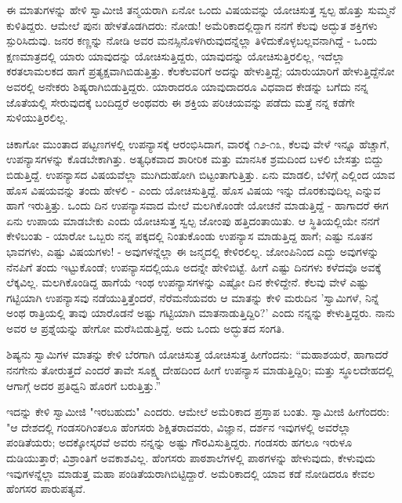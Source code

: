 ಈ ಮಾತುಗಳನ್ನು ಹೇಳಿ ಸ್ವಾಮೀಜಿ ತನ್ಮಯರಾಗಿ ಏನೋ ಒಂದು ವಿಷಯವನ್ನು ಯೋಚಿಸುತ್ತ ಸ್ವಲ್ಪ ಹೊತ್ತು ಸುಮ್ಮನೆ ಕುಳಿತಿದ್ದರು. ಆಮೇಲೆ ಪುನಃ ಹೇಳತೊಡಗಿದರು: ನೋಡು! ಅಮೆರಿಕಾದಲ್ಲಿದ್ದಾಗ ನನಗೆ ಕೆಲವು ಅದ್ಭುತ ಶಕ್ತಿಗಳು ಸ್ಪುರಿಸಿದುವು. ಜನರ ಕಣ್ಣನ್ನು ನೋಡಿ ಅವರ ಮನಸ್ಸಿನೊಳಗಿರುವುದನ್ನೆಲ್ಲಾ ತಿಳಿದುಕೊಳ್ಳಬಲ್ಲವನಾಗಿದ್ದೆ - ಒಂದು ಕ್ಷಣಮಾತ್ರದಲ್ಲಿ ಯಾರು ಯಾವುದನ್ನು ಯೋಚಿಸುತ್ತಿದ್ದರು, ಯಾವುದನ್ನು ಯೋಚಿಸುತ್ತಿರಲಿಲ್ಲ, ಇದೆಲ್ಲಾ ಕರತಲಾಮಲಕದ ಹಾಗೆ ಪ್ರತ್ಯಕ್ಷವಾಗಿಬಿಡುತ್ತಿತ್ತು. ಕೆಲಕೆಲವರಿಗೆ ಅದನ್ನು ಹೇಳುತ್ತಿದ್ದೆ; ಯಾರುಯಾರಿಗೆ ಹೇಳುತ್ತಿದ್ದೆನೋ ಅವರಲ್ಲಿ ಅನೇಕರು ಶಿಷ್ಯರಾಗಿಬಿಡುತ್ತಿದ್ದರು. ಯಾರಾದರೂ ಯಾವುದಾದರೂ ವಿಧವಾದ ಕೇಡನ್ನು ಬಗೆದು ನನ್ನ ಜೊತೆಯಲ್ಲಿ ಸೇರುವುದಕ್ಕೆ ಬಂದಿದ್ದರೆ ಅಂಥವರು ಈ ಶಕ್ತಿಯ ಪರಿಚಯವನ್ನು ಪಡೆದು ಮತ್ತೆ ನನ್ನ ಕಡೆಗೇ ಸುಳಿಯುತ್ತಿರಲಿಲ್ಲ.

ಚಿಕಾಗೋ ಮುಂತಾದ ಪಟ್ಟಣಗಳಲ್ಲಿ ಉಪನ್ಯಾಸಕ್ಕೆ ಆರಂಭಿಸಿದಾಗ, ವಾರಕ್ಕೆ ೧೨-೧೩, ಕೆಲವು ವೇಳೆ ಇನ್ನೂ ಹೆಚ್ಚಾಗೆ, ಉಪನ್ಯಾಸಗಳನ್ನು ಕೊಡಬೇಕಾಗಿತ್ತು. ಅತ್ಯಧಿಕವಾದ ಶಾರೀರಿಕ ಮತ್ತು ಮಾನಸಿಕ ಶ್ರಮದಿಂದ ಬಳಲಿ ಬೇಸತ್ತು ಬಿದ್ದು ಬಿಡುತ್ತಿದ್ದೆ. ಉಪನ್ಯಾಸದ ವಿಷಯವೆಲ್ಲಾ ಮುಗಿದುಹೋಗಿ ಬಿಟ್ಟಂತಾಗುತ್ತಿತ್ತು. ಏನು ಮಾಡಲಿ, ಬೆಳಿಗ್ಗೆ ಎಲ್ಲಿಂದ ಯಾವ ಹೊಸ ವಿಷಯವನ್ನು ತಂದು ಹೇಳಲಿ - ಎಂದು ಯೋಚಿಸುತ್ತಿದ್ದೆ. ಹೊಸ ವಿಷಯ ಇನ್ನು ದೊರಕುವುದಿಲ್ಲ ಎನ್ನುವ ಹಾಗೆ ಇರುತ್ತಿತ್ತು. ಒಂದು ದಿನ ಉಪನ್ಯಾಸವಾದ ಮೇಲೆ ಮಲಗಿಕೊಂಡೇ ಯೋಚನೆ ಮಾಡುತ್ತಿದ್ದೆ - ಹಾಗಾದರೆ ಈಗ ಏನು ಉಪಾಯ ಮಾಡಬೇಕು ಎಂದು ಯೋಚಿಸುತ್ತ ಸ್ವಲ್ಪ ಜೋಂಪು ಹತ್ತಿದಂತಾಯಿತು. ಆ ಸ್ಥಿತಿಯಲ್ಲಿಯೇ ನನಗೆ ಕೇಳಿಬಂತು - ಯಾರೋ ಒಬ್ಬರು ನನ್ನ ಪಕ್ಕದಲ್ಲಿ ನಿಂತುಕೊಂಡು ಉಪನ್ಯಾಸ ಮಾಡುತ್ತಿದ್ದ ಹಾಗೆ; ಎಷ್ಟು ನೂತನ ಭಾವಗಳು, ಎಷ್ಟು ವಿಷಯಗಳು! - ಅವುಗಳನ್ನೆಲ್ಲಾ ಈ ಜನ್ಮದಲ್ಲಿ ಕೇಳಿರಲಿಲ್ಲ. ಜೋಂಪಿನಿಂದ ಎದ್ದು ಅವುಗಳನ್ನು ನೆನಪಿಗೆ ತಂದು ಇಟ್ಟುಕೊಂಡೆ; ಉಪನ್ಯಾಸದಲ್ಲಿಯೂ ಅದನ್ನೇ ಹೇಳಿಬಿಟ್ಟೆ. ಹೀಗೆ ಎಷ್ಟು ದಿನಗಳು ಕಳೆದವೊ ಅವಕ್ಕೆ ಲೆಕ್ಕವಿಲ್ಲ. ಮಲಗಿಕೊಂಡಿದ್ದ ಹಾಗೆಯೆ ಇಂಥ ಉಪನ್ಯಾಸಗಳನ್ನು ಎಷ್ಟೋ ದಿನ ಕೇಳಿದ್ದೇನೆ. ಕೆಲವು ವೇಳೆ ಎಷ್ಟು ಗಟ್ಟಿಯಾಗಿ ಉಪನ್ಯಾಸವು ನಡೆಯುತ್ತಿತ್ತೆಂದರೆ, ನೆರೆಮನೆಯವರು ಆ ಮಾತನ್ನು ಕೇಳಿ ಮರುದಿನ 'ಸ್ವಾಮಿಗಳೆ, ನಿನ್ನೆ ಅಂಥ ರಾತ್ರಿಯಲ್ಲಿ ತಾವು ಯಾರೊಡನೆ ಅಷ್ಟು ಗಟ್ಟಿಯಾಗಿ ಮಾತನಾಡುತ್ತಿದ್ದಿರಿ?' ಎಂದು ನನ್ನನ್ನು ಕೇಳುತ್ತಿದ್ದರು. ನಾನು ಅವರ ಆ ಪ್ರಶ್ನೆಯನ್ನು ಹೇಗೋ ಮರೆಸಿಬಿಡುತ್ತಿದ್ದೆ. ಅದು ಒಂದು ಅದ್ಭುತದ ಸಂಗತಿ.

ಶಿಷ್ಯನು ಸ್ವಾಮಿಗಳ ಮಾತನ್ನು ಕೇಳಿ ಬೆರಗಾಗಿ ಯೋಚಿಸುತ್ತ ಯೋಚಿಸುತ್ತ ಹೀಗೆಂದನು: “ಮಹಾಶಯರೆ, ಹಾಗಾದರೆ ನನಗೇನು ತೋರುತ್ತದೆ ಎಂದರೆ ತಾವೇ ಸೂಕ್ಷ್ಮ ದೇಹದಿಂದ ಹೀಗೆ ಉಪನ್ಯಾಸ ಮಾಡುತ್ತಿದ್ದಿರಿ; ಮತ್ತು ಸ್ಥೂಲದೇಹದಲ್ಲಿ ಆಗಾಗ್ಗೆ ಅದರ ಪ್ರತಿಧ್ವನಿ ಹೊರಗೆ ಬರುತ್ತಿತ್ತು.”

ಇದನ್ನು ಕೇಳಿ ಸ್ವಾಮೀಜಿ "ಇರಬಹುದು" ಎಂದರು. ಆಮೇಲೆ ಅಮೆರಿಕಾದ ಪ್ರಸ್ತಾಪ ಬಂತು. ಸ್ವಾಮೀಜಿ ಹೀಗೆಂದರು: "ಆ ದೇಶದಲ್ಲಿ ಗಂಡಸರಿಗಿಂತಲೂ ಹೆಂಗಸರು ಶಿಕ್ಷಿತರಾದವರು, ವಿಜ್ಞಾನ, ದರ್ಶನ ಇವುಗಳಲ್ಲಿ ಅವರೆಲ್ಲಾ ಪಂಡಿತೆಯರು; ಅದಕ್ಕೋಸ್ಕರವೆ ಅವರು ನನ್ನನ್ನು ಅಷ್ಟು ಗೌರವಿಸುತ್ತಿದ್ದರು. ಗಂಡಸರು ಹಗಲೂ ಇರುಳೂ ದುಡಿಯುತ್ತಾರೆ; ವಿಶ್ರಾಂತಿಗೆ ಅವಕಾಶವಿಲ್ಲ. ಹೆಂಗಸರು ಪಾಠಶಾಲೆಗಳಲ್ಲಿ ಪಾಠಗಳನ್ನು ಹೇಳುವುದು, ಕೇಳುವುದು ಇವುಗಳನ್ನೆಲ್ಲಾ ಮಾಡುತ್ತ ಮಹಾ ಪಂಡಿತೆಯರಾಗಿಬಿಟ್ಟಿದ್ದಾರೆ. ಅಮೆರಿಕಾದಲ್ಲಿ ಯಾವ ಕಡೆ ನೋಡಿದರೂ ಕೇವಲ ಹೆಂಗಸರ ಪಾರುಪತ್ಯವೆ.

